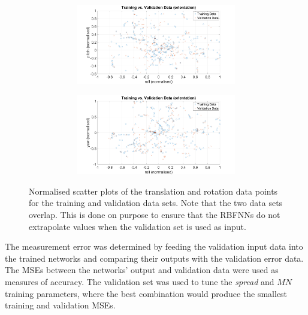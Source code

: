 \begin{figure}
  ~
  \begin{subfigure}{\textwidth}
    \begin{subfigure}{0.48\textwidth}
      \includegraphics[clip, trim = 80 0 80 0, width=\textwidth]{figures/chapter4/tr_v_v_rollpitch}
    \end{subfigure}
    \begin{subfigure}{0.48\textwidth}
      \includegraphics[clip, trim = 80 0 80 0, width=\textwidth]{figures/chapter4/tr_v_v_rollyaw}
    \end{subfigure}
    \caption{}
  \end{subfigure}
  \caption[Scatter plots of the training and validation data. ]{Normalised scatter plots of the translation and rotation data points for the training and validation data sets. Note that the two data sets overlap. This is done on purpose to ensure that the RBFNNs do not extrapolate values when the validation set is used as input. }
  \label{fig:chap4-scatter-tr-v}
\end{figure}

The measurement error was determined by feeding the validation input data into the trained networks and comparing their outputs with the validation error data. The MSEs between the networks' output and validation data were used as measures of accuracy. The validation set was used to tune the \emph{spread} and $\mathit{MN}$ training parameters, where the best combination would produce the smallest training and validation MSEs. 

